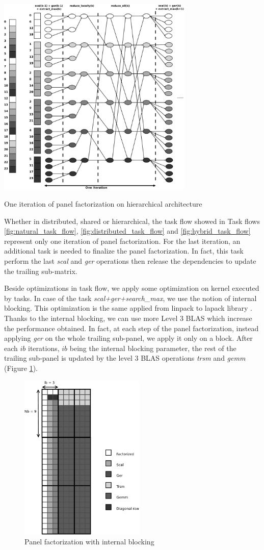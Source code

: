 \begin{taskflow}[!ht]
\centering
\includegraphics[width=0.7\textwidth]{figures/hybrid_tf_bw.pdf}
\caption{One iteration of panel factorization on hierarchical architecture \label{fig:hybrid_task_flow}}
\end{taskflow}
 
Whether in distributed, shared or hierarchical, the task flow showed in Task flows \ref{fig:natural_task_flow}, \ref{fig:distributed_task_flow} and \ref{fig:hybrid_task_flow} represent only one iteration of panel factorization. For the last iteration, an additional task is needed to finalize the panel factorization. In fact, this task perform the last \emph{scal} and \emph{ger} operations then release the dependencies to update the trailing sub-matrix.

Beside optimizations in task flow, we apply some optimization on kernel executed by tasks. In case of the task \textit{scal+ger+search\_max}, we use the notion of internal blocking. This optimization is the same applied from linpack to lapack library \cite{Anderson:1990:LPL}. Thanks to the internal blocking, we can use more Level 3 BLAS which increase the performance obtained. In fact, at each step of the panel factorization, instead applying \emph{ger} on the whole trailing sub-panel, we apply it only on a block. After each $ib$ iterations, $ib$ being the internal blocking parameter, the rest of the trailing sub-panel is updated by the level 3 BLAS operations \emph{trsm} and \emph{gemm} (Figure \ref{fig:panel_ib}).

\begin{figure}[!ht]
\centering
\includegraphics[height=8cm]{figures/panel_ib_bw.pdf}
\caption{Panel factorization with internal blocking\label{fig:panel_ib}}
\end{figure}
